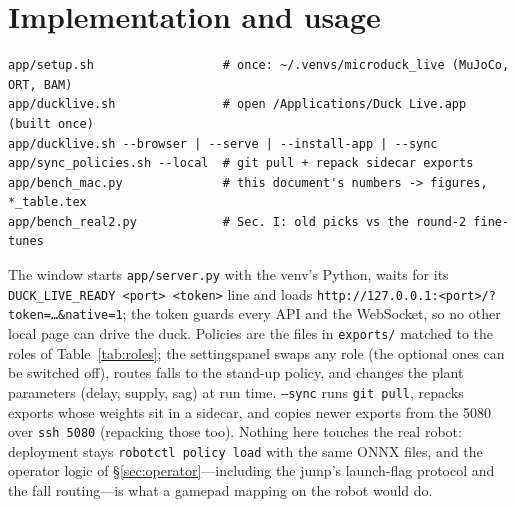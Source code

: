 \documentclass[11pt]{article}
\newcommand{\code}[1]{\texttt{\small #1}}
\newcommand{\tab}[1]{Table~\ref{tab:#1}}
\newcommand{\gear}{\textsf{settings}}
\begin{document}
\section{Implementation and usage}
\begin{verbatim}
app/setup.sh                  # once: ~/.venvs/microduck_live (MuJoCo, ORT, BAM)
app/ducklive.sh               # open /Applications/Duck Live.app (built once)
app/ducklive.sh --browser | --serve | --install-app | --sync
app/sync_policies.sh --local  # git pull + repack sidecar exports
app/bench_mac.py              # this document's numbers -> figures, *_table.tex
app/bench_real2.py            # Sec. I: old picks vs the round-2 fine-tunes
\end{verbatim}
The window starts \code{app/server.py} with the venv's Python, waits for its \code{DUCK\_LIVE\_READY <port>
<token>} line and loads \code{http://127.0.0.1:<port>/?token=\ldots\&native=1}; the token guards every API and
the WebSocket, so no other local page can drive the duck. Policies are the files in \code{exports/} matched to the
roles of \tab{roles}; the \gear panel swaps any role (the optional ones can be switched off), routes falls to the
stand-up policy, and changes the plant parameters (delay, supply, sag) at run time. \code{--sync} runs
\code{git pull}, repacks exports whose weights sit in a sidecar, and copies newer exports from the 5080 over
\code{ssh 5080} (repacking those too). Nothing here touches the real robot: deployment stays \code{robotctl policy
load} with the same ONNX files, and the operator logic of \S\ref{sec:operator}---including the jump's launch-flag
protocol and the fall routing---is what a gamepad mapping on the robot would do.
\end{document}
